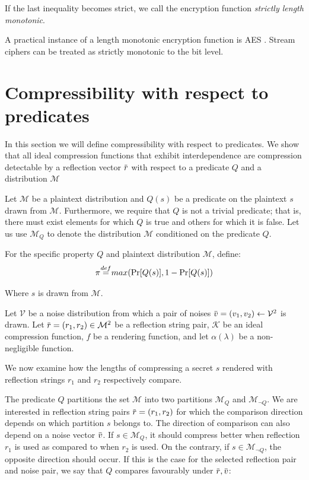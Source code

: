 \documentclass[conference, letterpaper, 10pt]{IEEEtran}
\newcommand\defeq{\stackrel{\mathclap{\normalfont\mbox{def}}}{=}}
\newcommand{\overbar}[1]{\mkern 1.5mu\overline{\mkern-1.5mu#1\mkern-1.5mu}\mkern 1.5mu}
\begin{document}
If the last inequality becomes strict, we call the encryption function
\textit{strictly length monotonic}.

A practical instance of a length monotonic encryption function is AES \cite{c8}.
Stream ciphers can be treated as strictly monotonic to the bit level.

\section{Compressibility with respect to predicates}\label{sec:propertycom}
In this section we will define compressibility with respect to predicates. We
show that all ideal compression functions that exhibit interdependence are
compression detectable by a reflection vector $\overbar{r}$ with respect to a
predicate $Q$ and a distribution $\mathcal{M}$

Let $\mathcal{M}$ be a plaintext distribution and $Q(s)$ be a predicate on the
plaintext $s$ drawn from $\mathcal{M}$. Furthermore, we require that $Q$ is not a
trivial predicate; that is, there must exist elements for which $Q$ is true and
others for which it is false.  Let us use $\mathcal{M}_Q$ to denote the
distribution $\mathcal{M}$ conditioned on the predicate $Q$.

For the specific property $Q$ and plaintext distribution $\mathcal{M}$, define:
\begin{equation*}
    \pi \defeq max(\Pr[Q(s)], 1 - \Pr[Q(s)])
\end{equation*}

Where $s$ is drawn from $\mathcal{M}$.

Let $\mathcal{V}$ be a noise distribution from which a pair of noises
$\overbar{v} = (v_1, v_2) \leftarrow \mathcal{V}^2$ is drawn.  Let $\overbar{r}
= (r_1, r_2) \in \mathcal{M}^2$ be a reflection string pair, $\mathcal{K}$ be an ideal
compression function, $f$ be a rendering function, and let $\alpha(\lambda)$ be
a non-negligible function.

We now examine how the lengths of compressing a secret $s$ rendered with
reflection strings $r_1$ and $r_2$ respectively compare.

The predicate $Q$ partitions the set $\mathcal{M}$ into two partitions
$\mathcal{M}_Q$ and $\mathcal{M}_{\lnot Q}$. We are interested in reflection
string pairs $\overbar{r} = (r_1, r_2)$ for which the comparison direction
depends on which partition $s$ belongs to.  The direction of comparison can
also depend on a noise vector $\overbar{v}$.  If $s \in \mathcal{M}_Q$, it
should compress better when reflection $r_1$ is used as compared to when $r_2$
is used. On the contrary, if $s \in \mathcal{M}_{\lnot Q}$, the opposite
direction should occur.  If this is the case for the selected reflection pair
and noise pair, we say that $Q$ compares favourably under $\overbar{r},
\overbar{v}$:
\end{document}
